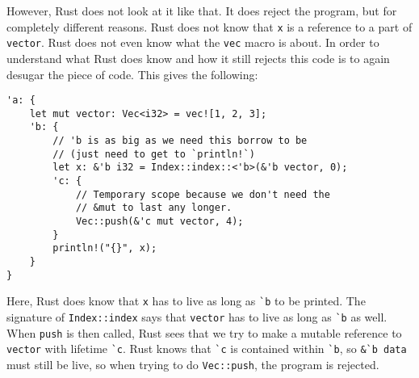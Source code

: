 However, Rust does not look at it like that. It does reject the program, but for completely different reasons. Rust does not know that \verb|x| is a reference to a part of \verb|vector|. Rust does not even know what the \verb|vec| macro is about. In order to understand what Rust does know and how it still rejects this code is to again desugar the piece of code. This gives the following: 

\begin{verbatim}
'a: {
    let mut vector: Vec<i32> = vec![1, 2, 3];
    'b: {
        // 'b is as big as we need this borrow to be
        // (just need to get to `println!`)
        let x: &'b i32 = Index::index::<'b>(&'b vector, 0);
        'c: {
            // Temporary scope because we don't need the
            // &mut to last any longer.
            Vec::push(&'c mut vector, 4);
        }
        println!("{}", x);
    }
}
\end{verbatim}

Here, Rust does know that \verb|x| has to live as long as \verb|`b| to be printed. The signature of \verb|Index::index| says that \verb|vector| has to live as long as \verb|`b| as well. When \verb|push| is then called, Rust sees that we try to make a mutable reference to \verb|vector| with lifetime \verb|`c|. Rust knows that \verb|`c| is contained within \verb|`b|, so \verb|&`b data| must still be live, so when trying to do \verb|Vec::push|, the program is rejected. 
